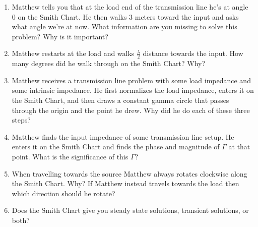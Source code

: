 \documentclass{article}
\begin{document}
\begin{enumerate}
    \item Matthew tells you that at the load end of the transmission line he's at angle 0 on the Smith Chart. He then walks 3 meters toward the input and asks what angle we're at now. What information are you missing to solve this problem? Why is it important?
    \item Matthew restarts at the load and walks $\frac{\lambda}{2}$ distance towards the input. How many degrees did he walk through on the Smith Chart? Why?
    \item Matthew receives a transmission line problem with some load impedance and some intrinsic impedance. He first normalizes the load impedance, enters it on the Smith Chart, and then draws a constant gamma circle that passes through the origin and the point he drew. Why did he do each of these three steps?
    \item Matthew finds the input impedance of some transmission line setup. He enters it on the Smith Chart and finds the phase and magnitude of $\Gamma$ at that point. What is the significance of this $\Gamma$?
    \item When travelling towards the source Matthew always rotates clockwise along the Smith Chart. Why? If Matthew instead travels towards the load then which direction should he rotate?
    \item Does the Smith Chart give you steady state solutions, transient solutions, or both?
\end{enumerate}
\end{document}
